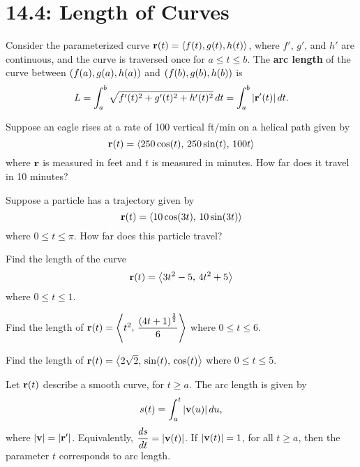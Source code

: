\documentclass[../mathNotesPreamble]{subfiles}
\begin{document}
\section{14.4: Length of Curves}
  \begin{defn*}
    Consider the parameterized curve ${\mathbf{r}}(t)={\left\langle f(t),g(t),h(t) \right\rangle}$, where $f'$, $g'$, and $h'$ are continuous, and the curve is traversed once for $a\leq t\leq b$. The \textbf{arc length} of the curve between ${\left(f(a), g(a), h(a)\right)}$ and ${\left(f(b), g(b), h(b)\right)}$ is
    \[L=\int_a^b \sqrt{f'(t)^2+g'(t)^2+h'(t)^2}\,dt=\int_a^b{\left\vert{\mathbf{r}}'(t)\right\vert}\,dt.\]
  \end{defn*}
  \begin{ex*}
    Suppose an eagle rises at a rate of 100 vertical ft/min on a helical path given by
      \[{\mathbf{r}}(t)={\left\langle 250\cos(t),\,250\sin(t),\,100t \right\rangle}\] 
    where ${\mathbf{r}}$ is measured in feet and $t$ is measured in minutes. How far does it travel in 10 minutes?
  \end{ex*}
  \pagebreak

  \begin{ex*}
    Suppose a particle has a trajectory given by 
      \[{\mathbf{r}}(t)={\left\langle 10\cos(3t),\,10\sin(3t) \right\rangle}\]
    where $0\leq t\leq \pi$. How far does this particle travel?
  \end{ex*}

  \begin{ex*}
    Find the length of the curve
      \[{\mathbf{r}}(t)={\left\langle 3t^2-5,\,4t^2+5 \right\rangle}\]
    where $0\leq t\leq 1$.
  \end{ex*}
  \pagebreak

  \begin{ex*}
    Find the length of ${\mathbf{r}}(t)={\left\langle t^2,\,\dfrac{{\left(4t+1\right)}^{\frac{3}{2}}}{6} \right\rangle}$ where $0\leq t\leq 6$.
  \end{ex*}

  \begin{ex*}
    Find the length of ${\mathbf{r}}(t)={\left\langle 2\sqrt{2},\,\sin(t),\,\cos(t) \right\rangle}$ where $0\leq t\leq 5$.
  \end{ex*}
  \pagebreak

  \begin{thmBox*}
    Let ${\mathbf{r}}(t)$ describe a smooth curve, for $t\geq a$. The arc length is given by 
      \[s(t)=\int_a^t {\left\vert{\mathbf{v}}(u)\right\vert}\,du,\]
    where ${\left\vert{\mathbf{v}}\right\vert}={\left\vert{\mathbf{r}}'\right\vert}$. Equivalently, $\displaystyle \frac{ds}{dt}={\left\vert{\mathbf{v}}(t)\right\vert}$. If ${\left\vert{\mathbf{v}}(t)\right\vert}=1$, for all $t\geq a$, then the parameter $t$ corresponds to arc length.
  \end{thmBox*}
\end{document}
